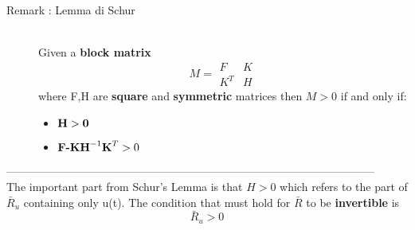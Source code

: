 \begin{description}
\item[Remark : Lemma di Schur]\hfill\\
Given a \textbf{block matrix}  
$$ M= 
\begin{array}{c|c}
  F & K \\ 
  \hline
  K^T & H
 \end{array}$$
 where F,H are \textbf{square} and \textbf{symmetric} matrices then $M>0$ if and only if:
\begin{itemize}
\item $ \text{\textbf{H}} > \text{\textbf{0}}$
\item $\text{\textbf{F-KH}}^{-1}\text{\textbf{K}}^T > 0$
\end{itemize}
\end{description}
---------------------------------------------------------------------------------------------------
\\The important part from Schur's Lemma is that $H>0$ which refers to the part of $\bar{R}_{u}$ containing only u(t).
The condition that must hold for $\bar{R}$ to be \textbf{invertible} is
\[
\boxed{\bar{R}_u >0}
\]
